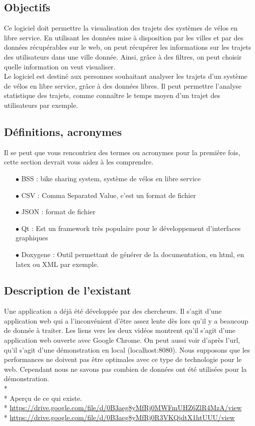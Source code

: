 \documentclass[12pt]{article}
\begin{document}
		\subsection{Objectifs}
			Ce logiciel doit permettre la visualisation des trajets des systèmes de vélos en libre service. En utilisant les données mise à disposition par les villes et par des données récupérables sur le web, on peut récupérer les informations sur les trajets des utilisateurs dans une ville donnée. Ainsi, grâce à des filtres, on peut choisir quelle information on veut visualiser.\\
			Le logiciel est destiné aux personnes souhaitant analyser les trajets d'un système de vélos en libre service, grâce à des données libres. Il peut permettre l'analyse statistique des trajets, comme connaître le temps moyen d'un trajet des utilisateurs par exemple.

		\subsection{Définitions, acronymes}
			Il se peut que vous rencontriez des termes ou acronymes pour la première fois, cette section devrait vous aidez à les comprendre.
			\begin{itemize}
				\item[$\bullet$] BSS : bike sharing system, système de vélos en libre service
				\item[$\bullet$] CSV : Comma Separated Value, c'est un format de fichier
				\item[$\bullet$] JSON : format de fichier
				\item[$\bullet$] Qt : Est un framework très populaire pour le développement d'interfaces graphiques
				\item[$\bullet$] Doxygene : Outil permettant de générer de la documentation, en html, en latex ou XML par exemple.
			\end{itemize}

		\subsection{Description de l'existant}
			Une application a déjà été développée par des chercheurs. Il s’agit d’une application web qui a l’inconvénient d’être assez lente dès lors qu’il y a beaucoup de donnée à traiter. Les liens vers les deux vidéos montrent qu'il s'agit d'une application web ouverte avec Google Chrome. On peut aussi voir d'après l'url, qu'il s'agit d'une démonstration en local (localhost:8080). Nous supposons que les performances ne doivent pas être optimales avec ce type de technologie pour le web. Cependant nous ne savons pas combien de données ont été utilisées pour la démonstration.\\*\\*
			Aperçu de ce qui existe.\\*
			\url{https://drive.google.com/file/d/0B3aeg8yMfRj0MWFmUHZ6ZlR4MzA/view}\\*
			\url{https://drive.google.com/file/d/0B3aeg8yMfRj0R3VKQjdtX1htUUU/view}
		
\end{document}
